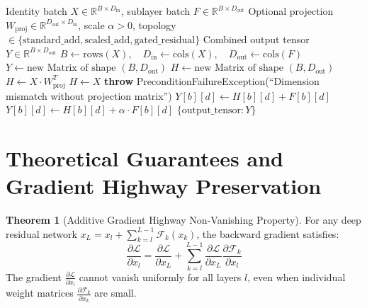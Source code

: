 \documentclass[11pt,a4paper]{article}
\theoremstyle{definition}
\newtheorem{theorem}{Theorem}[section]
\begin{document}
\begin{algorithm}[H]
\caption{Residual Connection Forward Merge}
\begin{algorithmic}[1]
\Require Identity batch $X \in \mathbb{R}^{B \times D_{\text{in}}}$, sublayer batch $F \in \mathbb{R}^{B \times D_{\text{out}}}$
\Require Optional projection $W_{\text{proj}} \in \mathbb{R}^{D_{\text{out}} \times D_{\text{in}}}$, scale $\alpha > 0$, topology $\in \{\text{standard\_add}, \text{scaled\_add}, \text{gated\_residual}\}$
\Ensure Combined output tensor $Y \in \mathbb{R}^{B \times D_{\text{out}}}$
\State $B \gets \text{rows}(X), \quad D_{\text{in}} \gets \text{cols}(X), \quad D_{\text{out}} \gets \text{cols}(F)$
\State $Y \gets \text{new Matrix of shape } (B, D_{\text{out}})$
\State $H \gets \text{new Matrix of shape } (B, D_{\text{out}})$
    \State $H \gets X \cdot W_{\text{proj}}^T$
    \State $H \gets X$
\Else
    \State \textbf{throw} PreconditionFailureException(``Dimension mismatch without projection matrix'')
\EndIf
{}
            \State $Y[b][d] \gets H[b][d] + F[b][d]$
            \State $Y[b][d] \gets H[b][d] + \alpha \cdot F[b][d]$
        \EndIf
    \EndFor
\EndFor
\State \Return $\{\text{output\_tensor}: Y\}$
\end{algorithmic}
\end{algorithm}

\section{Theoretical Guarantees and Gradient Highway Preservation}

\begin{theorem}[Additive Gradient Highway Non-Vanishing Property]
For any deep residual network $x_L = x_l + \sum_{k=l}^{L-1} \mathcal{F}_k(x_k)$, the backward gradient satisfies:
\begin{equation}
\frac{\partial \mathcal{L}}{\partial x_l} = \frac{\partial \mathcal{L}}{\partial x_L} + \sum_{k=l}^{L-1} \frac{\partial \mathcal{L}}{\partial x_L} \frac{\partial \mathcal{F}_k}{\partial x_l}
\end{equation}
The gradient $\frac{\partial \mathcal{L}}{\partial x_l}$ cannot vanish uniformly for all layers $l$, even when individual weight matrices $\frac{\partial \mathcal{F}_k}{\partial x_k}$ are small.
\end{theorem}
\end{document}
